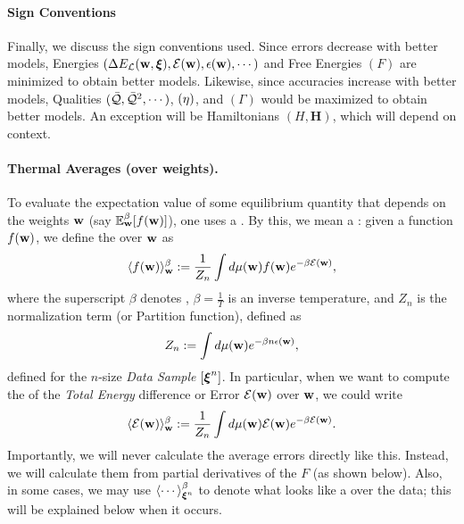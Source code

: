 \paragraph{Sign Conventions}
Finally, we discuss the sign conventions used.  Since errors decrease with better models,
Energies $(\Delta E_{\mathcal{L}}(\mathbf{w},\boldsymbol{\xi}), \mathcal{E}(\mathbf{w}), \epsilon({\mathbf{w}}), \cdots)$ and Free Energies $(F)$ are minimized to obtain better models.
Likewise, since accuracies increase with better models, Qualities $(\bar{\mathcal{Q}}, \bar{\mathcal{Q}}^{2}, \cdots)$,
\SelfOverlap $(\eta)$, and \Quality \GeneratingFunction $(\Gamma)$ would be maximized to obtain better models.
An exception will be Hamiltonians $(H,\mathbf{H})$, which will depend on context.

\paragraph{Thermal Averages (over weights).}

To evaluate the expectation value of some equilibrium quantity that depends on the weights ${\mathbf{w}}$ (say $\mathbb{E}^{\beta}_{{\mathbf{w}}}[f({\mathbf{w}})]$), one uses a \ThermalAverage.
By this, we mean a \emph{\BoltzmannWeightedAverage}: given a function $f({\mathbf{w}})$,
we define the \ThermalAverage over ${\mathbf{w}}$ as
\begin{align}
\label{eqn:thrmavg}
\langle f({\mathbf{w}})\rangle_{{\mathbf{w}}}^{{\beta}}:=\dfrac{1}{Z_{n}}\int d\mu({\mathbf{w}}) f({\mathbf{w}})e^{-\beta \mathcal{E}(\mathbf{w})}  ,
\end{align}
where the superscript $\beta$ denotes \ThermalAverage,
$\beta=\frac{1}{T}$ is an inverse temperature, and 
$Z_{n}$ is the normalization term (or Partition function), defined as
\begin{align}
\label{eqn:Zwn}
Z_{n}:=\int d\mu({\mathbf{w}}) e^{-\beta n\epsilon({\mathbf{w}})},
\end{align}
defined for the $n$-size \emph{Data Sample} $[\boldsymbol{\xi}^{n}]$.
%
In particular, when we want to compute the \ThermalAverage of the \emph{Total Energy} difference or Error
$\mathcal{E}(\mathbf{w})$ over ${\mathbf{w}}$, we could write
\begin{align}
\label{eqn:Detot}
\langle \mathcal{E}(\mathbf{w}) \rangle^{\beta}_{{\mathbf{w}}}:=\dfrac{1}{Z_{n}}\int d\mu({\mathbf{w}}) \mathcal{E}(\mathbf{w}) e^{-\beta \mathcal{E}(\mathbf{w})} .
\end{align}
Importantly, we will never calculate the average errors directly like this.
Instead, we will calculate them from partial derivatives of the \FreeEnergy $F$ (as shown below).
Also, in some cases, we may use $\langle \cdots \rangle^{\beta}_{\boldsymbol{\xi}^{n}}$ to denote what looks like a \ThermalAverage over the data; this will be explained below when it occurs.

